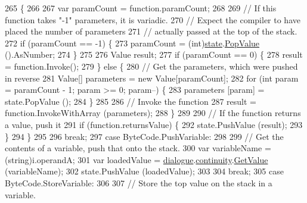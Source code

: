 \begin{DoxyCode}
265                 \{
266 
267                     var paramCount = function.paramCount;
268 
269                     \textcolor{comment}{// If this function takes "-1" parameters, it is variadic.}
270                     \textcolor{comment}{// Expect the compiler to have placed the number of parameters}
271                     \textcolor{comment}{// actually passed at the top of the stack.}
272                     \textcolor{keywordflow}{if} (paramCount == -1) \{
273                         paramCount = (int)\hyperlink{a00138_a70f2ce6201cdd2430ceaa764ac614ca0}{state}.\hyperlink{a00141_a36881a888ea2839d74c3d4e7c199f4ee}{PopValue} ().AsNumber;
274                     \}
275 
276                     Value result;
277                     \textcolor{keywordflow}{if} (paramCount == 0) \{
278                         result = function.Invoke();
279                     \} \textcolor{keywordflow}{else} \{
280                         \textcolor{comment}{// Get the parameters, which were pushed in reverse}
281                         Value[] parameters = \textcolor{keyword}{new} Value[paramCount];
282                         \textcolor{keywordflow}{for} (\textcolor{keywordtype}{int} param = paramCount - 1; param >= 0; param--) \{
283                             parameters [param] = state.PopValue ();
284                         \}
285 
286                         \textcolor{comment}{// Invoke the function}
287                         result = function.InvokeWithArray (parameters);
288                     \}
289 
290                     \textcolor{comment}{// If the function returns a value, push it}
291                     \textcolor{keywordflow}{if} (\textcolor{keyword}{function}.returnsValue) \{
292                         state.PushValue (result);
293                     \}
294                 \}
295 
296                 \textcolor{keywordflow}{break};
297             \textcolor{keywordflow}{case} ByteCode.PushVariable:
298 
299                 \textcolor{comment}{// Get the contents of a variable, push that onto the stack.}
300                 var variableName = (string)i.operandA;
301                 var loadedValue = \hyperlink{a00138_ac506426c503da5f033247c29e11c5e82}{dialogue}.\hyperlink{a00072_ae94eaa4b03b432422f5d205fabe37ff5}{continuity}.\hyperlink{a00166_accab1fc5c8fc353dbfc53ca0f4029576}{GetValue} (variableName);
302                 state.PushValue (loadedValue);
303 
304                 \textcolor{keywordflow}{break};
305             \textcolor{keywordflow}{case} ByteCode.StoreVariable:
306 
307                 \textcolor{comment}{// Store the top value on the stack in a variable.}

\end{DoxyCode}
